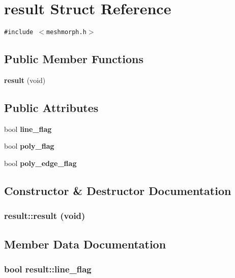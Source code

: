 \section{result Struct Reference}
\label{structresult}
{\tt \#include $<$meshmorph.h$>$}

\subsection*{Public Member Functions}
\begin{CompactItemize}
\item 
{\bf result} (void)
\end{CompactItemize}
\subsection*{Public Attributes}
\begin{CompactItemize}
\item 
bool {\bf line\_\-flag}
\item 
bool {\bf poly\_\-flag}
\item 
bool {\bf poly\_\-edge\_\-flag}
\end{CompactItemize}


\subsection{Constructor \& Destructor Documentation}
\subsubsection{\setlength{\rightskip}{0pt plus 5cm}result::result (void)\hspace{0.3cm}{\tt  [inline]}}\label{structresult_774c09f44e22e83b75f9dd4aa57c0222}




\subsection{Member Data Documentation}
\subsubsection{\setlength{\rightskip}{0pt plus 5cm}bool {\bf result::line\_\-flag}}\label{structresult_863743df4ba769d16c7a7596a7ab00d3}


